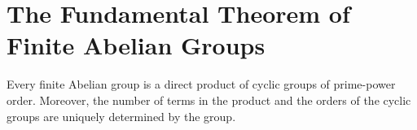 \section{The Fundamental Theorem of Finite Abelian Groups}

\begin{theorem}
	Every finite Abelian group is a direct product of cyclic groups of prime-power order. Moreover, the number of terms in the product and the orders of the cyclic groups are uniquely determined by the group.
\end{theorem}
